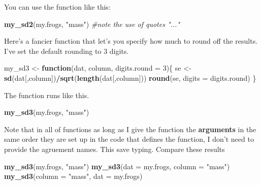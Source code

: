 \documentclass[]{book}
\newenvironment{Shaded}{\begin{snugshade}}{\end{snugshade}}
\newcommand{\KeywordTok}[1]{\textcolor[rgb]{0.13,0.29,0.53}{\textbf{#1}}}
\newcommand{\DataTypeTok}[1]{\textcolor[rgb]{0.13,0.29,0.53}{#1}}
\newcommand{\DecValTok}[1]{\textcolor[rgb]{0.00,0.00,0.81}{#1}}
\newcommand{\StringTok}[1]{\textcolor[rgb]{0.31,0.60,0.02}{#1}}
\newcommand{\CommentTok}[1]{\textcolor[rgb]{0.56,0.35,0.01}{\textit{#1}}}
\newcommand{\ControlFlowTok}[1]{\textcolor[rgb]{0.13,0.29,0.53}{\textbf{#1}}}
\newcommand{\OperatorTok}[1]{\textcolor[rgb]{0.81,0.36,0.00}{\textbf{#1}}}
\newcommand{\NormalTok}[1]{#1}
\theoremstyle{definition}
\theoremstyle{definition}
\theoremstyle{definition}
\theoremstyle{remark}
\begin{document}
You can use the function like this:

\begin{Shaded}
\begin{Highlighting}[]
\KeywordTok{my_sd2}\NormalTok{(my.frogs, }\StringTok{"mass"}\NormalTok{) }\CommentTok{#note the use of quotes "..."}
\end{Highlighting}
\end{Shaded}

Here's a fancier function that let's you specify how much to round off
the results. I've set the default rounding to 3 digits.

\begin{Shaded}
\begin{Highlighting}[]
\NormalTok{my_sd3 <-}\StringTok{ }\ControlFlowTok{function}\NormalTok{(dat, column, }\DataTypeTok{digits.round =} \DecValTok{3}\NormalTok{)\{}
\NormalTok{  se <-}\StringTok{ }\KeywordTok{sd}\NormalTok{(dat[,column])}\OperatorTok{/}\KeywordTok{sqrt}\NormalTok{(}\KeywordTok{length}\NormalTok{(dat[,column]))}
  \KeywordTok{round}\NormalTok{(se, }\DataTypeTok{digits =}\NormalTok{ digits.round)}
\NormalTok{\}}
\end{Highlighting}
\end{Shaded}

The function runs like this.

\begin{Shaded}
\begin{Highlighting}[]
\KeywordTok{my_sd3}\NormalTok{(my.frogs, }\StringTok{"mass"}\NormalTok{)}
\end{Highlighting}
\end{Shaded}

Note that in all of functions as long as I give the function the
\textbf{arguments} in the same order they are set up in the code that
defines the function, I don't need to provide the agruement names. This
save typing. Compare these results

\begin{Shaded}
\begin{Highlighting}[]
\KeywordTok{my_sd3}\NormalTok{(my.frogs, }\StringTok{"mass"}\NormalTok{)}
\KeywordTok{my_sd3}\NormalTok{(}\DataTypeTok{dat =}\NormalTok{ my.frogs, }\DataTypeTok{column =}  \StringTok{"mass"}\NormalTok{)}
\KeywordTok{my_sd3}\NormalTok{(}\DataTypeTok{column =}  \StringTok{"mass"}\NormalTok{, }\DataTypeTok{dat =}\NormalTok{ my.frogs)}
\end{Highlighting}
\end{Shaded}
\end{document}
